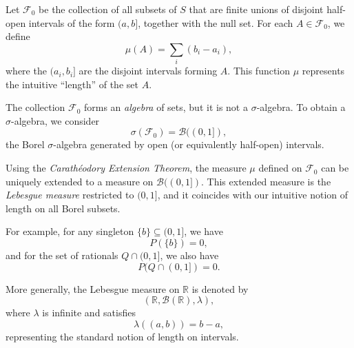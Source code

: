 \vspace{0.5em}
\noindent
Let $\mathcal{F}_0$ be the collection of all subsets of $S$ that are finite unions of disjoint half-open intervals of the form $(a, b]$, together with the null set.  
For each $A \in \mathcal{F}_0$, we define
\[
\mu(A) = \sum_{i} (b_i - a_i),
\]
where the $(a_i, b_i]$ are the disjoint intervals forming $A$.  
This function $\mu$ represents the intuitive “length” of the set $A$.

\vspace{0.5em}
\noindent
The collection $\mathcal{F}_0$ forms an \emph{algebra} of sets, but it is not a $\sigma$-algebra.  
To obtain a $\sigma$-algebra, we consider
\[
\sigma(\mathcal{F}_0) = \mathcal{B}((0,1]),
\]
the Borel $\sigma$-algebra generated by open (or equivalently half-open) intervals.

\vspace{0.5em}
\noindent
Using the \emph{Carathéodory Extension Theorem}, the measure $\mu$ defined on $\mathcal{F}_0$ can be uniquely extended to a measure on $\mathcal{B}((0,1])$.  
This extended measure is the \emph{Lebesgue measure} restricted to $(0,1]$, and it coincides with our intuitive notion of length on all Borel subsets.

\vspace{0.5em}
\noindent
For example, for any singleton $\{b\} \subseteq (0,1]$, we have
\[
P(\{b\}) = 0,
\]
and for the set of rationals $Q \cap (0,1]$, we also have
\[
P(Q \cap (0,1]) = 0.
\]

\vspace{0.5em}
\noindent
More generally, the Lebesgue measure on $\mathbb{R}$ is denoted by
\[
(\mathbb{R}, \mathcal{B}(\mathbb{R}), \lambda),
\]
where $\lambda$ is infinite and satisfies
\[
\lambda((a,b)) = b - a,
\]
representing the standard notion of length on intervals.

